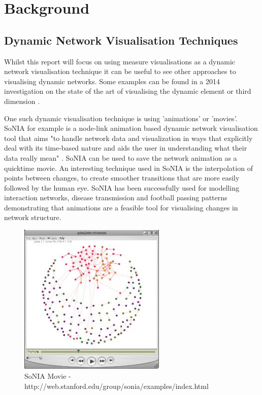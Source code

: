 
\chapter{Background}

\section{Dynamic Network Visualisation Techniques}

Whilst this report will focus on using measure visualisations as a dynamic network visualisation technique it can be useful to see other approaches to visualising dynamic networks. Some examples can be found in a 2014 investigation on the state of the art of visualising the dynamic element or third dimension \cite{tsotaivg}.

One such dynamic visualisation technique is using 'animations' or 'movies'. SoNIA \cite{sonia} for example is a node-link animation based dynamic network visualisation tool that aims "to handle network data and visualization in ways that explicitly deal with its time-based nature and aids the user in understanding what their data really mean" \cite{taasodnv}. SoNIA can be used to save the network animation as a quicktime movie. An interesting technique used in SoNIA is the interpolation of points between changes, to create smoother transitions that are more easily followed by the human eye. SoNIA has been successfully used for modelling interaction networks, disease transmission and football passing patterns demonstrating that animations are a feasible tool for visualising changes in network structure.

\begin{figure}
\begin{center}
\includegraphics[trim={0 0 0 0}, width=70mm]{./Figures/soniaPic.jpg}
\caption{SoNIA Movie - http://web.stanford.edu/group/sonia/examples/index.html}
\end{center}
\end{figure}

